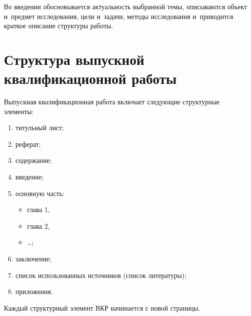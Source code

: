 \documentclass[a4paper,12pt]{diplom}
\begin{document}
\maketitle

\begin{abstract}
Это пример оформления дипломной работы с помощью издательской системы \LaTeXe.

Реферат размещается <<непосредственно>> за титульным листом. Объем реферата должен составлять не более половины страницы. В~реферате указываются параметры ВКР: объем работы в страницах, количество глав, иллюстраций, таблиц, приложений, использованных источников. Перечень ключевых слов должен включать от~5 до~15 слов или словосочетаний из текста работы, которые в~наибольшей мере характеризуют ее содержание и~обеспечивают возможность информационного поиска. Ключевые слова приводятся в именительном падеже и~печатаются прописными буквами полужирным шрифтом в~строку через запятые.

Текст реферата должен отражать объект исследования, цель работы, результаты работы, область применения, степень внедрения или рекомендации по~внедрению.
\end{abstract}

\tableofcontents[Содержание]

Во введении обосновывается актуальность выбранной темы,
описываются объект и~предмет исследования, цели и~задачи, методы исследования и~приводится краткое описание структуры работы.

\chapter[Структура выпускной квалификационной работы]{Структура выпускной\\ квалификационной работы}
Выпускная квалификационная работа включает следующие структурные элементы:
\begin{enumerate}[label=\arabic{enumi})]
  \item титульный лист;
  \item реферат;
  \item содержание;
  \item введение;
  \item основную часть:
  \begin{itemize}
    \item глава 1,
    \item глава 2,
    \item \dots;
  \end{itemize}
  \item заключение;
  \item список использованных источников (список литературы);
  \item приложения.
\end{enumerate}
Каждый структурный элемент ВКР начинается с новой страницы.
\end{document}
